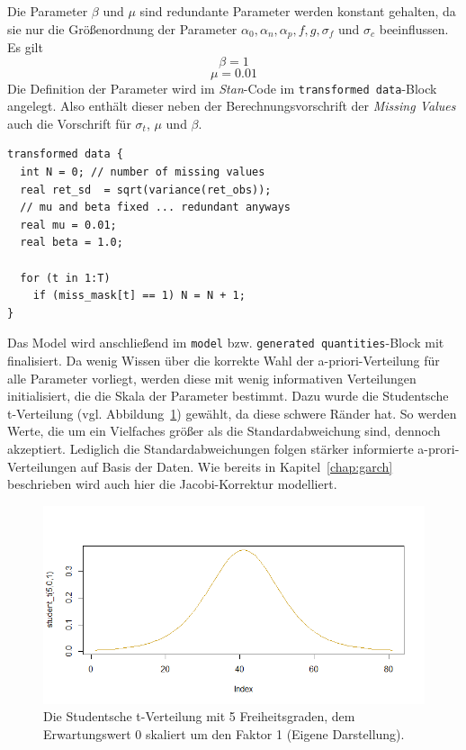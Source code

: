 \documentclass[ngerman]{ttlab-qualify}
\begin{document}
Die Parameter $\beta$ und $\mu$ sind redundante Parameter werden konstant gehalten, da sie nur die Größenordnung der Parameter $\alpha_0,\alpha_n,\alpha_p, f, g, \sigma_f$ und $\sigma_c$ beeinflussen. \\
Es gilt
\[\beta = 1\]
\[\mu = 0.01\]
Die Definition der Parameter wird im \textit{Stan}-Code im \verb|transformed data|-Block angelegt. Also enthält dieser neben der Berechnungsvorschrift der \textit{Missing Values} auch die Vorschrift für $\sigma_t$, $\mu$ und $\beta$.
\begin{lstlisting}[style=custom]
transformed data {
  int N = 0; // number of missing values
  real ret_sd  = sqrt(variance(ret_obs));
  // mu and beta fixed ... redundant anyways
  real mu = 0.01;
  real beta = 1.0;

  for (t in 1:T)
    if (miss_mask[t] == 1) N = N + 1;
}
\end{lstlisting}
Das Model wird anschließend im \verb|model| bzw. \verb|generated quantities|-Block mit finalisiert. Da wenig Wissen über die korrekte Wahl der a-priori-Verteilung für alle Parameter vorliegt, werden diese mit wenig informativen Verteilungen initialisiert, die die Skala der Parameter bestimmt. Dazu wurde die Studentsche t-Verteilung (vgl. Abbildung~\ref{fig:student-t}) gewählt, da diese schwere Ränder hat. So werden Werte, die um ein Vielfaches größer als die Standardabweichung sind, dennoch akzeptiert. Lediglich die Standardabweichungen folgen stärker informierte a-prori-Verteilungen auf Basis der Daten. Wie bereits in Kapitel~\ref{chap:garch} beschrieben wird auch hier die Jacobi-Korrektur modelliert. 
\begin{figure}[H]
\begin{center}
\includegraphics[scale=.5]{images/student_t}
\caption{Die Studentsche t-Verteilung mit 5 Freiheitsgraden, dem Erwartungswert 0 skaliert um den Faktor 1 (Eigene Darstellung).}
\label{fig:student-t}
\end{center}
\end{figure}
\end{document}
